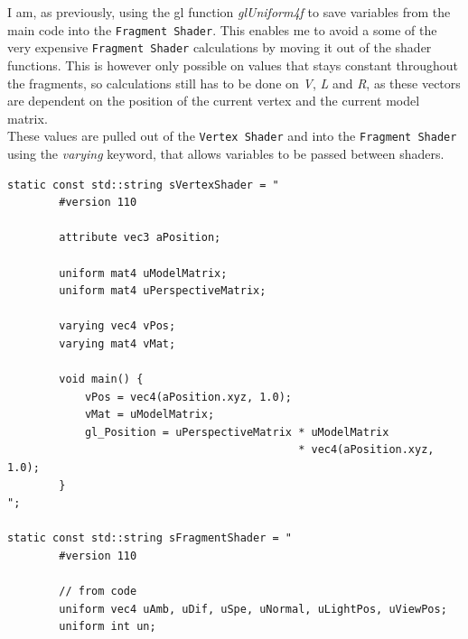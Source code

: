 \documentclass{article}
\begin{document}
I am, as previously, using the gl function \emph{glUniform4f} to save
variables from the main code into the \texttt{Fragment Shader}. This enables me to
avoid a some of the very expensive \texttt{Fragment Shader} calculations by moving
it out of the shader functions. This is however only possible on values
that stays constant throughout the fragments, so calculations still has to be
done on \emph{V}, \emph{L} and \emph{R}, as these vectors are dependent on the
position of the current vertex and the current model matrix. \\
These values are pulled out of the \texttt{Vertex Shader} and into the \texttt{Fragment Shader}
using the \emph{varying} keyword, that allows variables to be passed between shaders. 
\begin{verbatim}
static const std::string sVertexShader = "												 
        #version 110                                                                    
                                                                                        
        attribute vec3 aPosition;														
                                                                                        
        uniform mat4 uModelMatrix;														
        uniform mat4 uPerspectiveMatrix;												
                                                                                        
        varying vec4 vPos;              												
        varying mat4 vMat;              												
                                                                                        
        void main() {                                                                   
            vPos = vec4(aPosition.xyz, 1.0);                                            
            vMat = uModelMatrix;                                                        
            gl_Position = uPerspectiveMatrix * uModelMatrix 
                                             * vec4(aPosition.xyz, 1.0);	
        }																				
";

static const std::string sFragmentShader = "														  
        #version 110																	  
                                                                                          
        // from code																	  
        uniform vec4 uAmb, uDif, uSpe, uNormal, uLightPos, uViewPos;	         		  
        uniform int un;																	  
                                                                                          

\end{verbatim}
\end{document}
